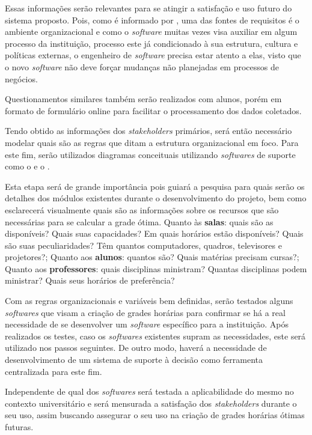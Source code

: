 Essas informações serão relevantes para se atingir a satisfação e uso futuro do sistema proposto. Pois, como é informado por , uma das fontes de requisitos é o ambiente organizacional e como o \textit{software} muitas vezes visa auxiliar em algum processo da instituição, processo este já condicionado à sua estrutura, cultura e políticas externas, o engenheiro de \textit{software} precisa estar atento a elas, visto que o novo \textit{software} não deve forçar mudanças não planejadas em processos de negócios.

Questionamentos similares também serão realizados com alunos, porém em formato de formulário online para facilitar o processamento dos dados coletados.

Tendo obtido as informações dos \textit{stakeholders} primários, será então necessário modelar quais são as regras que ditam a estrutura organizacional em foco. Para este fim, serão utilizados diagramas conceituais utilizando \textit{softwares} de suporte como o  e o .

Esta etapa será de grande importância pois guiará a pesquisa para quais serão os detalhes dos módulos existentes durante o desenvolvimento do projeto, bem como esclarecerá visualmente quais são as informações sobre os recursos que são necessárias para se calcular a grade ótima. Quanto às \textbf{salas}: quais são as disponíveis? Quais suas capacidades? Em quais horários estão disponíveis? Quais são suas peculiaridades? Têm quantos computadores, quadros, televisores e projetores?; Quanto aos \textbf{alunos}: quantos são? Quais matérias precisam cursas?; Quanto aos \textbf{professores}: quais disciplinas ministram? Quantas disciplinas podem ministrar? Quais seus horários de preferência?

Com as regras organizacionais e variáveis bem definidas, serão testados alguns \textit{softwares} que visam a criação de grades horárias para confirmar se há a real necessidade de se desenvolver um \textit{software} específico para a instituição. Após realizados os testes, caso os \textit{softwares} existentes supram as necessidades, este será utilizado nos passos seguintes. De outro modo, haverá a necessidade de desenvolvimento de um sistema de suporte à decisão como ferramenta centralizada para este fim.

Independente de qual dos \textit{softwares} será testada a aplicabilidade do mesmo no contexto universitário e será mensurada a satisfação dos \textit{stakeholders} durante o seu uso, assim buscando assegurar o seu uso na criação de grades horárias ótimas futuras.

